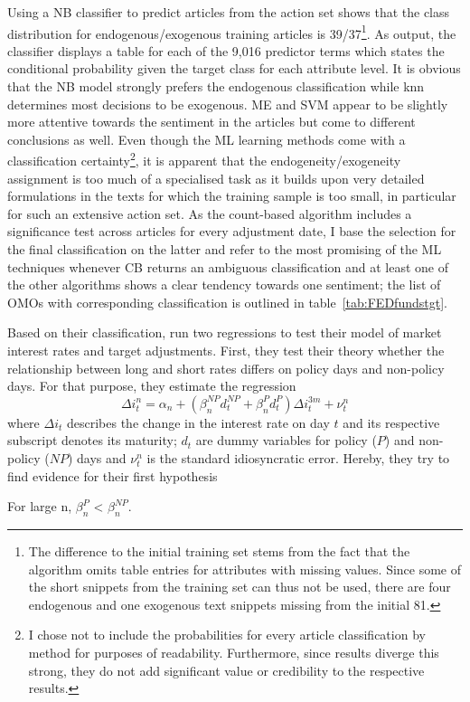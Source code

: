 %
%
Using a NB classifier to predict articles from the action set shows that the class distribution for endogenous/exogenous training articles is 39/37\footnote{The difference to the initial training set stems from the fact that the algorithm omits table entries for attributes with missing values. Since some of the short snippets from the training set can thus not be used, there are four endogenous and one exogenous text snippets missing from the initial 81.}. As output, the classifier displays a table for each of the 9,016 predictor terms which states the conditional probability given the target class for each attribute level. %
%
%
It is obvious that the NB model strongly prefers the endogenous classification while knn determines most decisions to be exogenous. ME and SVM appear to be slightly more attentive towards the sentiment in the articles but come to different conclusions as well. Even though the ML learning methods come with a classification certainty\footnote{I chose not to include the probabilities for every article classification by method for purposes of readability. Furthermore, since results diverge this strong, they do not add significant value or credibility to the respective results.}, it is apparent that the endogeneity/exogeneity assignment is too much of a specialised task as it builds upon very detailed formulations in the texts for which the training sample is too small, in particular for such an extensive action set. As the count-based algorithm includes a significance test across articles for every adjustment date, I base the selection for the final classification on the latter and refer to the most promising of the ML techniques whenever CB returns an ambiguous classification and at least one of the other algorithms shows a clear tendency towards one sentiment; the list of OMOs with corresponding classification is outlined in table~\vref{tab:FEDfundstgt}. %

Based on their classification, \textcite{Ellingsen.2003} run two regressions to test their model of market interest rates and target adjustments. First, they test their theory whether the relationship between long and short rates differs on policy days and non-policy days. For that purpose, they estimate the regression
%
\begin{equation}
	\label{eq:PvsNP}
	\Delta i_t^n = \alpha_n + (\beta_n^{NP}d_t^{NP}+\beta_n^{P}d_t^{P})\Delta i_t^{3m}+\nu_t^n
\end{equation}
%
where $\Delta i_t$ describes the change in the interest rate on day $t$ and its respective subscript denotes its maturity; $d_t$ are dummy variables for policy ($P$) and non-policy ($NP$) days and $\nu_t^n$ is the standard idiosyncratic error. Hereby, they try to find evidence for their first hypothesis 
%
\begin{hypothesis}
	\label{H:1}
	For large n, $\beta_n^P$ < $\beta_n^{NP}$.
\end{hypothesis}
%

